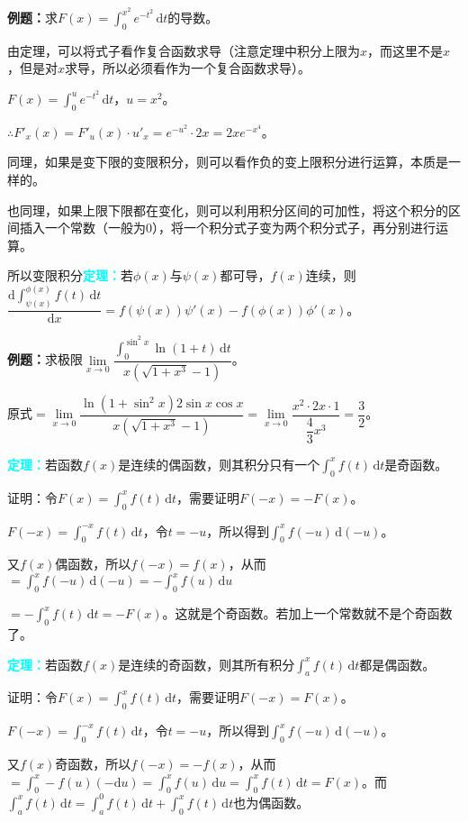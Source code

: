 \documentclass[UTF8, 12pt]{ctexart}
\begin{document}
\textbf{例题：}求$F(x)=\int_0^{x^2}e^{-t^2}\,\textrm{d}t$的导数。

由定理，可以将式子看作复合函数求导（注意定理中积分上限为$x$，而这里不是$x$，但是对$x$求导，所以必须看作为一个复合函数求导）。

$F(x)=\int_0^ue^{-t^2}\,\textrm{d}t$，$u=x^2$。

$\therefore F'_x(x)=F'_u(x)\cdot u'_x=e^{-u^2}\cdot 2x=2xe^{-x^4}$。

同理，如果是变下限的变限积分，则可以看作负的变上限积分进行运算，本质是一样的。

也同理，如果上限下限都在变化，则可以利用积分区间的可加性，将这个积分的区间插入一个常数（一般为0），将一个积分式子变为两个积分式子，再分别进行运算。

所以变限积分\textcolor{aqua}{\textbf{定理：}}若$\phi(x)$与$\psi(x)$都可导，$f(x)$连续，则$\dfrac{\textrm{d}\int_{\psi(x)}^{\phi(x)}f(t)\,\textrm{d}t}{\textrm{d}x}=f(\psi(x))\psi'(x)-f(\phi(x))\phi'(x)$。

\textbf{例题：}求极限$\lim\limits_{x\to 0}\dfrac{\int_0^{\sin^2x}\ln(1+t)\,\textrm{d}t}{x(\sqrt{1+x^3}-1)}$。

原式$=\lim\limits_{x\to 0}\dfrac{\ln(1+\sin^2x)2\sin x\cos x}{x(\sqrt{1+x^3}-1)}=\lim\limits_{x\to 0}\dfrac{x^2\cdot 2x\cdot 1}{\dfrac{4}{3}x^3}=\dfrac{3}{2}$。\smallskip

\textcolor{aqua}{\textbf{定理：}}若函数$f(x)$是连续的偶函数，则其积分只有一个$\int^x_0f(t)\,\textrm{d}t$是奇函数。

证明：令$F(x)=\int_0^xf(t)\,\textrm{d}t$，需要证明$F(-x)=-F(x)$。

$F(-x)=\int_0^{-x}f(t)\,\textrm{d}t$，令$t=-u$，所以得到$\int_0^xf(-u)\,\textrm{d}(-u)$。

又$f(x)$偶函数，所以$f(-x)=f(x)$，从而$=\int_0^xf(-u)\,\textrm{d}(-u)=-\int_0^xf(u)\,\textrm{d}u$

$=-\int_0^xf(t)\,\textrm{d}t=-F(x)$。这就是个奇函数。若加上一个常数就不是个奇函数了。

\textcolor{aqua}{\textbf{定理：}}若函数$f(x)$是连续的奇函数，则其所有积分$\int^x_af(t)\,\textrm{d}t$都是偶函数。

证明：令$F(x)=\int_0^xf(t)\,\textrm{d}t$，需要证明$F(-x)=F(x)$。

$F(-x)=\int_0^{-x}f(t)\,\textrm{d}t$，令$t=-u$，所以得到$\int_0^xf(-u)\,\textrm{d}(-u)$。

又$f(x)$奇函数，所以$f(-x)=-f(x)$，从而$=\int_0^x-f(u)(-\textrm{d}u)=\int_0^xf(u)\,\textrm{d}u=\int_0^xf(t)\,\textrm{d}t=F(x)$。而$\int_a^xf(t)\,\textrm{d}t=\int_a^0f(t)\,\textrm{d}t+\int_0^xf(t)\,\textrm{d}t$也为偶函数。
\end{document}
